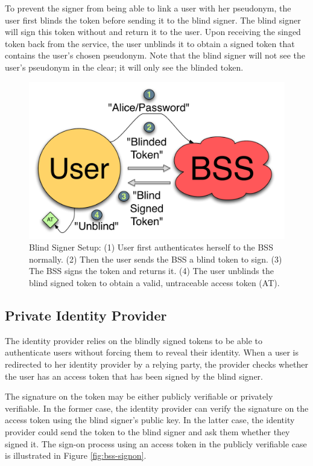 \documentclass{llncs}
\begin{document}
To prevent the signer from being able to link a user with her pseudonym, the user first blinds the token before sending it to the blind signer. The blind signer will sign this token without and return it to the user. Upon receiving the singed token back from the service, the user unblinds it to obtain a signed token that contains the user's chosen pseudonym. Note that the blind signer will not see the user's pseudonym in the clear; it will only see the blinded token.

\begin{figure}
  \centering
  \includegraphics[scale=0.6]{figs/fig-bss-setup-color.pdf}
  \caption{Blind Signer Setup: (1) User first authenticates herself to the BSS
  normally. (2) Then the user sends the BSS a blind token to sign. (3) The BSS
  signs the token and returns it. (4) The user unblinds the blind signed token
  to obtain a valid, untraceable access token (AT).}
  \label{fig:bss-setup}
\end{figure}

\subsection{Private Identity Provider}

The identity provider relies on the blindly signed tokens to be able to authenticate users without forcing them to reveal their identity. When a user is redirected to her identity provider by a relying party, the provider checks whether the user has an access token that has been signed by the blind signer.

The signature on the token may be either publicly verifiable or privately verifiable. In the former case, the identity provider can verify the signature on the access token using the blind signer's public key. In the latter case, the identity provider could send the token to the blind signer and ask them whether they signed it. The sign-on process using an access token in the publicly verifiable case is illustrated in Figure \ref{fig:bss-signon}.
\end{document}
